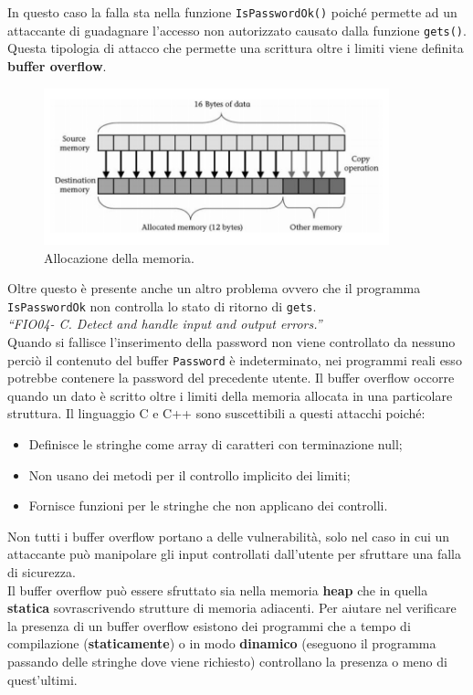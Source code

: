 In questo caso la falla sta nella funzione \verb|IsPasswordOk()| poiché permette ad
un attaccante di guadagnare l'accesso non autorizzato causato dalla
funzione \verb|gets()|. Questa tipologia di attacco che permette una scrittura oltre
i limiti viene definita \textbf{buffer overflow}.

\begin{figure}[H]
    \centering
    \includegraphics[width=10cm, keepaspectratio]{capitoli/secure_coding/img/cap_2/memory.png}
    \caption{Allocazione della memoria.}\label{fig:memoria}
\end{figure}

Oltre questo è presente anche un altro problema ovvero che il
programma \verb|IsPasswordOk| non controlla lo stato di ritorno di \verb|gets|. \\
\textit{“FIO04- C. Detect and handle input and output errors.”}\\
Quando si fallisce l'inserimento della password non viene controllato da nessuno
perciò il contenuto del buffer \verb|Password| è indeterminato, nei programmi reali
esso potrebbe contenere la password del precedente utente.
Il buffer overflow occorre quando un dato è scritto oltre i limiti della memoria
allocata in una particolare struttura. Il linguaggio C e C++ sono
suscettibili a questi attacchi poiché:

\begin{itemize}
    \item Definisce le stringhe come array di caratteri con terminazione null;
    \item Non usano dei metodi per il controllo implicito dei limiti;
    \item Fornisce funzioni per le stringhe che non applicano dei controlli.
\end{itemize}

Non tutti i buffer overflow portano a delle vulnerabilità, solo nel caso in cui un
attaccante può manipolare gli input controllati dall'utente per sfruttare una
falla di sicurezza.\\
Il buffer overflow può essere sfruttato sia nella memoria \textbf{heap} che in
quella \textbf{statica} sovrascrivendo strutture di memoria adiacenti.
Per aiutare nel verificare la presenza di un buffer overflow esistono dei programmi
che a tempo di compilazione (\textbf{staticamente}) o in modo \textbf{dinamico}
(eseguono il programma passando delle stringhe dove viene richiesto) controllano la
presenza o meno di quest'ultimi.


